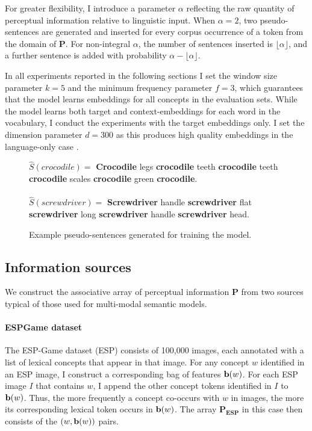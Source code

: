 For greater flexibility, I introduce a parameter \(\alpha\) reflecting the raw quantity of perceptual information relative to linguistic input. When \(\alpha=2\), two pseudo-sentences are generated and inserted for every corpus occurrence of a token from the domain of \(\mathbf{P}\). For non-integral \(\alpha \), the number of sentences inserted is \( \lfloor \alpha \rfloor \), and a further sentence is added with probability \(\alpha - \lfloor \alpha \rfloor \).

In all experiments reported in the following sections I set the window size parameter \(k = 5\) and the minimum frequency parameter \(f = 3\), which guarantees that the model learns embeddings for all concepts in the evaluation sets. While the model learns both target and context-embeddings for each word in the vocabulary, I conduct the experiments with the target embeddings only. I set the dimension parameter \(d = 300 \) as this produces high quality embeddings in the language-only case \citep{mikolov2013efficient}. 

\begin{figure} \(\hat{S}(crocodile) =\)\small{ {\bf Crocodile} legs {\bf crocodile} teeth {\bf crocodile} teeth {\bf crocodile} scales {\bf crocodile} green {\bf crocodile}. \\ \\ \(\hat{S}(screwdriver)=\) { \bf Screwdriver} handle {\bf screwdriver} flat  {\bf screwdriver} long {\bf screwdriver}  handle {\bf screwdriver}  head. } \caption{\label{examples} Example pseudo-sentences generated for training the model.}\end{figure}

\subsection{Information sources}
\label{percep_sources}

We construct the associative array of perceptual information \(\mathbf{P}\) from two sources typical of those used for multi-modal semantic models.

\paragraph{ESPGame dataset} The ESP-Game dataset (ESP) \citep{von2004labeling} consists of 100,000 images, each annotated with a list of lexical concepts that appear in that image. For any concept \(w\) identified in an ESP image, I construct a corresponding bag of features \({\bf b}(w)\). For each ESP image \(I\) that contains \(w\), I append the other concept tokens identified in \(I\) to \({\bf b}(w)\). Thus, the more frequently a concept co-occurs with \(w\) in images, the more its corresponding lexical token occurs in \({\bf b}(w)\). The array \(\mathbf{P_{ESP}}\) in this case then consists of the  \( (w,  {\bf b}(w) ) \) pairs.

